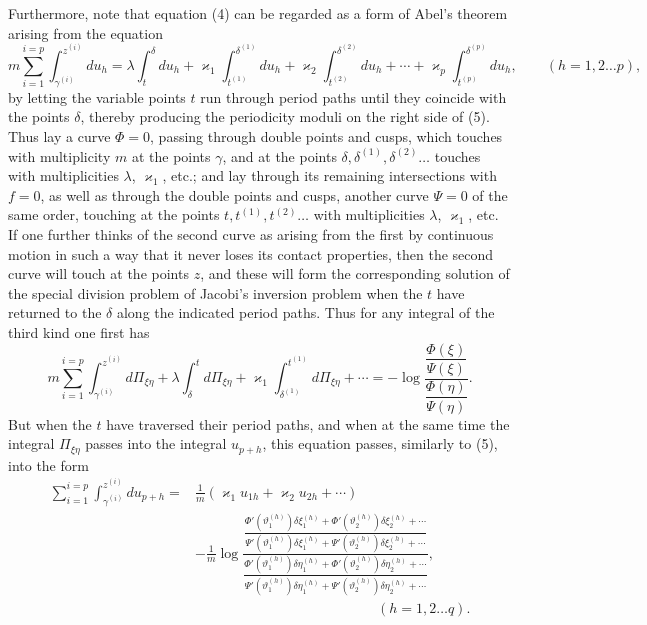 \documentclass[10pt]{article}
\begin{document}
Furthermore, note that equation (4) can be regarded as a form of Abel's theorem arising from the equation
\[
m\sum_{i=1}^{i=p}\int_{\gamma^{(i)}}^{z^{(i)}}du_h
=\lambda\int_t^{\delta}du_h+\varkappa_1\int_{t^{(1)}}^{\delta^{(1)}}du_h
+\varkappa_2\int_{t^{(2)}}^{\delta^{(2)}}du_h+\cdots+\varkappa_p\int_{t^{(p)}}^{\delta^{(p)}}du_h,
\qquad (h=1,2\ldots p),
\]
by letting the variable points \(t\) run through period paths until they coincide with the points \(\delta\), thereby producing the periodicity moduli on the right side of (5). Thus lay a curve \(\Phi=0\), passing through double points and cusps, which touches with multiplicity \(m\) at the points \(\gamma\), and at the points \(\delta,\delta^{(1)},\delta^{(2)}\ldots\) touches with multiplicities \(\lambda\), \(\varkappa_1\), etc.; and lay through its remaining intersections with \(f=0\), as well as through the double points and cusps, another curve \(\Psi=0\) of the same order, touching at the points \(t,t^{(1)},t^{(2)}\ldots\) with multiplicities \(\lambda\), \(\varkappa_1\), etc. If one further thinks of the second curve as arising from the first by continuous motion in such a way that it never loses its contact properties, then the second curve will touch at the points \(z\), and these will form the corresponding solution of the special division problem of Jacobi's inversion problem when the \(t\) have returned to the \(\delta\) along the indicated period paths. Thus for any integral of the third kind one first has
\[
m\sum_{i=1}^{i=p}\int_{\gamma^{(i)}}^{z^{(i)}}d\Pi_{\xi\eta}
+\lambda\int_{\delta}^{t}d\Pi_{\xi\eta}
+\varkappa_1\int_{\delta^{(1)}}^{t^{(1)}}d\Pi_{\xi\eta}+\cdots
=-\log\frac{\dfrac{\Phi(\xi)}{\Psi(\xi)}}{\dfrac{\Phi(\eta)}{\Psi(\eta)}}.
\]
But when the \(t\) have traversed their period paths, and when at the same time the integral \(\Pi_{\xi\eta}\) passes into the integral \(u_{p+h}\), this equation passes, similarly to (5), into the form
\[
\begin{aligned}
\sum_{i=1}^{i=p}\int_{\gamma^{(i)}}^{z^{(i)}}du_{p+h}
={}&\frac1m(\varkappa_1u_{1h}+\varkappa_2u_{2h}+\cdots)\\
&-\frac1m\log
\frac{\dfrac{\Phi'(\vartheta_1^{(h)})\delta\xi_1^{(h)}+\Phi'(\vartheta_2^{(h)})\delta\xi_2^{(h)}+\cdots}
{\Psi'(\vartheta_1^{(h)})\delta\xi_1^{(h)}+\Psi'(\vartheta_2^{(h)})\delta\xi_2^{(h)}+\cdots}}
{\dfrac{\Phi'(\vartheta_1^{(h)})\delta\eta_1^{(h)}+\Phi'(\vartheta_2^{(h)})\delta\eta_2^{(h)}+\cdots}
{\Psi'(\vartheta_1^{(h)})\delta\eta_1^{(h)}+\Psi'(\vartheta_2^{(h)})\delta\eta_2^{(h)}+\cdots}},\\
&\hspace{13em}(h=1,2\ldots q).
\end{aligned}
\]
\end{document}
